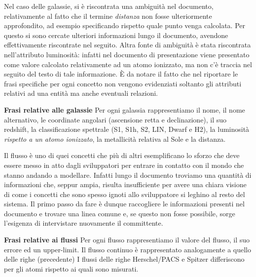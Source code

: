 \documentclass[12pt,a4paper,onecolumn,x11names]{article}
\begin{document}
	\begin{flushleft}
		Nel caso delle galassie, si è riscontrata una ambiguità nel documento, relativamente al fatto che il termine \textit{distanza} non fosse ulteriormente approfondito, ad esempio specificando rispetto quale punto venga calcolata. Per questo si sono cercate ulteriori informazioni lungo il documento, avendone effettivamente riscontrate nel seguito.\newline
		Altra fonte di ambiguità è stata riscontrata nell'attributo luminosità: infatti nel documento di presentazione viene presentato come valore calcolato relativamente ad un atomo ionizzato, ma non c'è traccia nel seguito del testo di tale informazione.
		È da notare il fatto che nel riportare le frasi specifiche per ogni concetto non vengono evidenziati soltanto gli attributi relativi ad una entità ma anche eventuali relazioni.
		
	\end{flushleft}
	
	\begin{framed}
		\begin{flushleft}
			\textbf{Frasi relative alle galassie}\newline
				Per ogni galassia rappresentiamo il nome, il nome alternativo, le coordinate angolari (ascensione retta e declinazione), il suo redshift, la classificazione spettrale (S1, S1h, S2, LIN, Dwarf e H2), la luminosità \textit{rispetto a un atomo ionizzato}, la metallicità relativa al Sole e la distanza.
		\end{flushleft}
	\end{framed}
	
	\begin{flushleft}
		Il flusso è uno di quei concetti che più di altri esemplificano lo sforzo che deve essere messo in atto dagli sviluppatori per entrare in contatto con il mondo che stanno andando a modellare. Infatti lungo il documento troviamo una quantità di informazioni che, seppur ampia, risulta insufficiente per avere una chiara visione di come i concetti che sono spesso ignoti allo sviluppatore si leghino al resto del sistema. Il primo passo da fare è dunque raccogliere le informazioni presenti nel documento e trovare una linea comune e, se questo non fosse possibile, sorge l'esigenza di intervistare nuovamente il committente.
	\end{flushleft}
	
	\begin{framed}
		\begin{flushleft}
			\textbf{Frasi relative ai flussi}\newline
			Per ogni flusso rappresentiamo il valore del flusso, il suo errore ed un upper-limit.
			Il flusso continuo è rappresentato analogamente a quello delle righe (precedente)
			I flussi delle righe Herschel/PACS e Spitzer differiscono per gli atomi rispetto ai quali sono misurati.
			\newline
		\end{flushleft}
	\end{framed}
	
\end{document}
